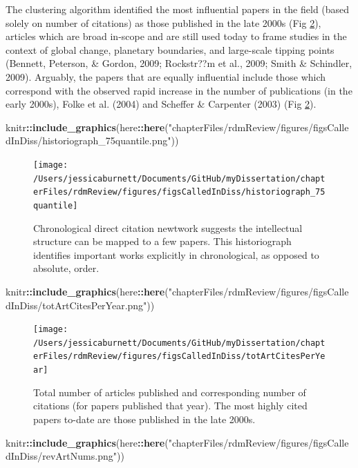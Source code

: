 \documentclass[12pt,twoside,openany]{reedthesis}
\newenvironment{Shaded}{\begin{snugshade}}{\end{snugshade}}
\newcommand{\KeywordTok}[1]{\textcolor[rgb]{0.13,0.29,0.53}{\textbf{#1}}}
\newcommand{\NormalTok}[1]{#1}
\newcommand{\OperatorTok}[1]{\textcolor[rgb]{0.81,0.36,0.00}{\textbf{#1}}}
\newcommand{\StringTok}[1]{\textcolor[rgb]{0.31,0.60,0.02}{#1}}
\begin{document}
The clustering algorithm identified the most influential papers in the field (based solely on number of citations) as those published in the late 2000s (Fig \ref{fig:totArtCitesPerYear}), articles which are broad in-scope and are still used today to frame studies in the context of global change, planetary boundaries, and large-scale tipping points (Bennett, Peterson, \& Gordon, 2009; Rockstr??m et al., 2009; Smith \& Schindler, 2009). Arguably, the papers that are equally influential include those which correspond with the observed rapid increase in the number of publications (in the early 2000s), Folke et al. (2004) and Scheffer \& Carpenter (2003) (Fig \ref{fig:totArtCitesPerYear}).
\begin{Shaded}
\begin{Highlighting}[]
\NormalTok{knitr}\OperatorTok{::}\KeywordTok{include_graphics}\NormalTok{(here}\OperatorTok{::}\KeywordTok{here}\NormalTok{(}\StringTok{"chapterFiles/rdmReview/figures/figsCalledInDiss/historiograph_75quantile.png"}\NormalTok{))}
\end{Highlighting}
\end{Shaded}
\begin{figure}
\texttt{[image: /Users/jessicaburnett/Documents/GitHub/myDissertation/chapterFiles/rdmReview/figures/figsCalledInDiss/historiograph\_75quantile]} \caption{Chronological direct citation newtwork suggests the intellectual structure can be mapped to a few papers. This historiograph identifies important works explicitly in chronological, as opposed to absolute, order.}\label{fig:historiograph}
\end{figure}
\begin{Shaded}
\begin{Highlighting}[]
\NormalTok{knitr}\OperatorTok{::}\KeywordTok{include_graphics}\NormalTok{(here}\OperatorTok{::}\KeywordTok{here}\NormalTok{(}\StringTok{"chapterFiles/rdmReview/figures/figsCalledInDiss/totArtCitesPerYear.png"}\NormalTok{))}
\end{Highlighting}
\end{Shaded}
\begin{figure}
\texttt{[image: /Users/jessicaburnett/Documents/GitHub/myDissertation/chapterFiles/rdmReview/figures/figsCalledInDiss/totArtCitesPerYear]} \caption{Total number of articles published and corresponding number of citations (for papers published that year). The most highly cited papers to-date are those published in the late 2000s.}\label{fig:totArtCitesPerYear}
\end{figure}
\begin{Shaded}
\begin{Highlighting}[]
\NormalTok{knitr}\OperatorTok{::}\KeywordTok{include_graphics}\NormalTok{(here}\OperatorTok{::}\KeywordTok{here}\NormalTok{(}\StringTok{"chapterFiles/rdmReview/figures/figsCalledInDiss/revArtNums.png"}\NormalTok{))}
\end{Highlighting}
\end{Shaded}
\end{document}
